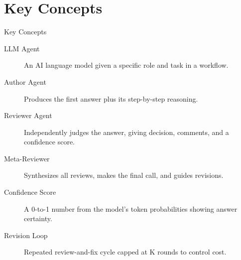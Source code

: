 \documentclass[10pt]{beamer}
\begin{document}
\section{Key Concepts}
\begin{frame}[allowframebreaks]{Key Concepts}
  \begin{description}
    \item[LLM Agent] An AI language model given a specific role and task in a workflow.
    \item[Author Agent] Produces the first answer plus its step-by-step reasoning.
    \item[Reviewer Agent] Independently judges the answer, giving decision, comments, and a confidence score.
    \item[Meta-Reviewer] Synthesizes all reviews, makes the final call, and guides revisions.
    \item[Confidence Score] A 0-to-1 number from the model's token probabilities showing answer certainty.
    \item[Revision Loop] Repeated review-and-fix cycle capped at K rounds to control cost.
  \end{description}
\end{frame}
\end{document}
